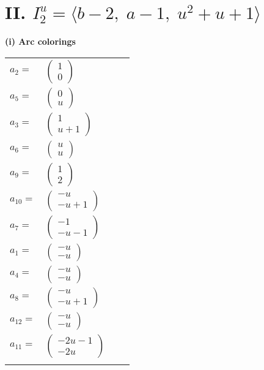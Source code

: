 \documentclass[1p]{elsarticle_modified}
\theoremstyle{definition}
\begin{document}
\centering \section*{II. $I^u_{2}= \langle b-2,\;a-1,\;u^2+u+1 \rangle$}
\flushleft \textbf{(i) Arc colorings}\\
\begin{tabular}{m{7pt} m{180pt} m{7pt} m{180pt} }
\flushright $a_{2}=$&$\begin{pmatrix}1\\0\end{pmatrix}$ \\
\flushright $a_{5}=$&$\begin{pmatrix}0\\u\end{pmatrix}$ \\
\flushright $a_{3}=$&$\begin{pmatrix}1\\u+1\end{pmatrix}$ \\
\flushright $a_{6}=$&$\begin{pmatrix}u\\u\end{pmatrix}$ \\
\flushright $a_{9}=$&$\begin{pmatrix}1\\2\end{pmatrix}$ \\
\flushright $a_{10}=$&$\begin{pmatrix}- u\\- u+1\end{pmatrix}$ \\
\flushright $a_{7}=$&$\begin{pmatrix}-1\\- u-1\end{pmatrix}$ \\
\flushright $a_{1}=$&$\begin{pmatrix}- u\\- u\end{pmatrix}$ \\
\flushright $a_{4}=$&$\begin{pmatrix}- u\\- u\end{pmatrix}$ \\
\flushright $a_{8}=$&$\begin{pmatrix}- u\\- u+1\end{pmatrix}$ \\
\flushright $a_{12}=$&$\begin{pmatrix}- u\\- u\end{pmatrix}$ \\
\flushright $a_{11}=$&$\begin{pmatrix}-2 u-1\\-2 u\end{pmatrix}$\\&\end{tabular}
\end{document}
